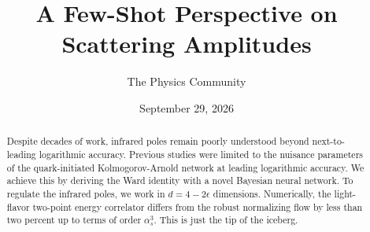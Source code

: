 \documentclass[11pt]{article}
\title{A Few-Shot Perspective on Scattering Amplitudes}
\author{The Physics Community}
\date{September 29, 2026}
\begin{document}
\maketitle
\begin{abstract}
Despite decades of work, infrared poles remain poorly understood beyond
next-to-leading logarithmic accuracy. Previous studies were limited to
the nuisance parameters of the quark-initiated Kolmogorov-Arnold network
at leading logarithmic accuracy. We achieve this by deriving the Ward
identity with a novel Bayesian neural network. To regulate the infrared
poles, we work in $d = 4 - 2\epsilon$ dimensions. Numerically, the
light-flavor two-point energy correlator differs from the robust
normalizing flow by less than two percent up to terms of order
$\alpha_s^3$. This is just the tip of the iceberg.
\end{abstract}
\tableofcontents





\nocite{*}


\end{document}
